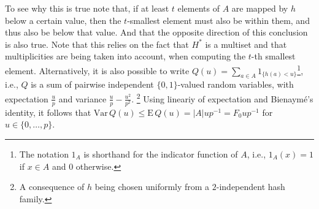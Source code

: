 \documentclass[11pt,a4paper]{article}
\newcommand{\var}{\mathrm{Var}}
\newcommand{\expectation}{\mathrm{E}}
\begin{document}
To see why this is true note that, if at least $t$ elements of $A$ are mapped by $h$ below a certain value, then the $t$-smallest element must also be within them, and thus also be below that value.
And that the opposite direction of this conclusion is also true.
Note that this relies on the fact that $H^*$ is a multiset and that multiplicities are being taken into account, when computing the $t$-th smallest element. 
Alternatively, it is also possible to write $Q(u) = \sum_{a \in A} 1_{\{h(a) < u\}}$\footnote{The notation $1_A$ is shorthand for the indicator function of $A$, i.e., $1_A(x)=1$ if $x \in A$ and $0$ otherwise.}, i.e., $Q$ is a sum of pairwise independent $\{0,1\}$-valued random variables, with expectation $\frac{u}{p}$ and variance $\frac{u}{p} - \frac{u^2}{p^2}$.
\footnote{A consequence of $h$ being chosen uniformly from a $2$-independent hash family.}
Using lineariy of expectation and Bienaym\'e's identity, it follows that $\var \, Q(u) \leq \expectation \, Q(u) = |A|u p^{-1} = F_0 u p^{-1}$ for $u \in \{0,\ldots,p\}$.
\end{document}
